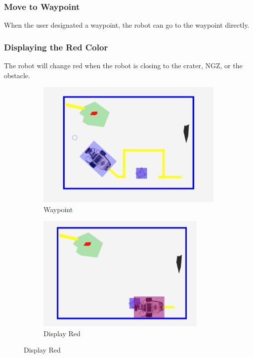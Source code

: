 \documentclass[10pt,a4paper,titlepage]{article}
\begin{document}
   
  \subsubsection{  Move to Waypoint} 
When the user designated a waypoint, the robot can go to the waypoint directly.  
   
	\subsubsection{  Displaying the Red Color} 
The robot will change red when the robot is closing to the crater, NGZ, or the obstacle.  

\begin{figure}[H]
	\centering
	\begin{subfigure}[t]{0.45\textwidth}
  \includegraphics[width=\linewidth]{waypoint.png}  %
\caption{Waypoint} 
\label{fig:Waypoint}                 
	\end{subfigure}
	\begin{subfigure}[t]{0.45\textwidth}
  \includegraphics[width=0.9\textwidth]{red.png}  %
\caption{Display Red} 
\label{fig:Display Red}              
	\end{subfigure}
\end{figure}
\end{document}
